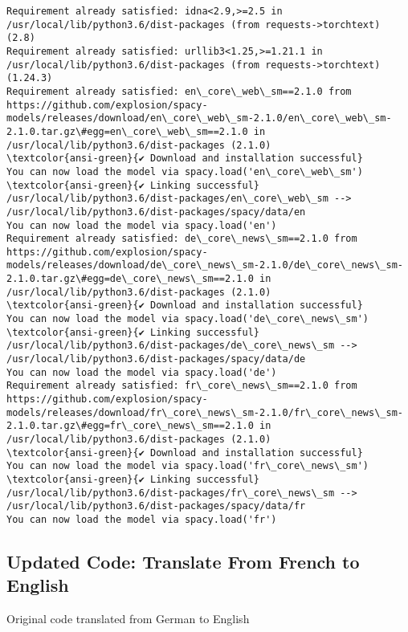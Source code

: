 \documentclass[11pt]{article}
\begin{document}
\begin{Verbatim}[commandchars=\\\{\}]
Requirement already satisfied: idna<2.9,>=2.5 in /usr/local/lib/python3.6/dist-packages (from requests->torchtext) (2.8)
Requirement already satisfied: urllib3<1.25,>=1.21.1 in /usr/local/lib/python3.6/dist-packages (from requests->torchtext) (1.24.3)
Requirement already satisfied: en\_core\_web\_sm==2.1.0 from https://github.com/explosion/spacy-models/releases/download/en\_core\_web\_sm-2.1.0/en\_core\_web\_sm-2.1.0.tar.gz\#egg=en\_core\_web\_sm==2.1.0 in /usr/local/lib/python3.6/dist-packages (2.1.0)
\textcolor{ansi-green}{✔ Download and installation successful}
You can now load the model via spacy.load('en\_core\_web\_sm')
\textcolor{ansi-green}{✔ Linking successful}
/usr/local/lib/python3.6/dist-packages/en\_core\_web\_sm -->
/usr/local/lib/python3.6/dist-packages/spacy/data/en
You can now load the model via spacy.load('en')
Requirement already satisfied: de\_core\_news\_sm==2.1.0 from https://github.com/explosion/spacy-models/releases/download/de\_core\_news\_sm-2.1.0/de\_core\_news\_sm-2.1.0.tar.gz\#egg=de\_core\_news\_sm==2.1.0 in /usr/local/lib/python3.6/dist-packages (2.1.0)
\textcolor{ansi-green}{✔ Download and installation successful}
You can now load the model via spacy.load('de\_core\_news\_sm')
\textcolor{ansi-green}{✔ Linking successful}
/usr/local/lib/python3.6/dist-packages/de\_core\_news\_sm -->
/usr/local/lib/python3.6/dist-packages/spacy/data/de
You can now load the model via spacy.load('de')
Requirement already satisfied: fr\_core\_news\_sm==2.1.0 from https://github.com/explosion/spacy-models/releases/download/fr\_core\_news\_sm-2.1.0/fr\_core\_news\_sm-2.1.0.tar.gz\#egg=fr\_core\_news\_sm==2.1.0 in /usr/local/lib/python3.6/dist-packages (2.1.0)
\textcolor{ansi-green}{✔ Download and installation successful}
You can now load the model via spacy.load('fr\_core\_news\_sm')
\textcolor{ansi-green}{✔ Linking successful}
/usr/local/lib/python3.6/dist-packages/fr\_core\_news\_sm -->
/usr/local/lib/python3.6/dist-packages/spacy/data/fr
You can now load the model via spacy.load('fr')

    \end{Verbatim}

    \hypertarget{updated-code-translate-from-french-to-english}{%
\subsection{Updated Code: Translate From French to
English}\label{updated-code-translate-from-french-to-english}}

Original code translated from German to English
\end{document}
